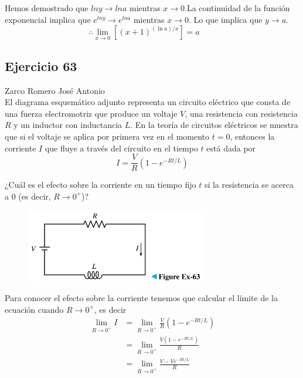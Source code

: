 \documentclass[12pt]{article}
\begin{document}
\begin{enumerate}[label=(\alph*)]
Hemos demostrado que $lny   \rightarrow lna $ mientras $x \rightarrow 0$.La continuidad de la función exponencial implica que $e^{lny}  \rightarrow e^{lna} $ mientras   $x \rightarrow 0$. Lo que implica que $y \rightarrow a $.
\[
\therefore
\lim_{x \to 0} [(x+1)^{(\ln a)/x}]=a \qquad
\]

\end{enumerate}

\subsection{Ejercicio 63} Zarco Romero José Antonio \\

El diagrama esquemático adjunto representa un circuito eléctrico que consta de una fuerza electromotriz que produce un voltaje $V$, una resistencia con resistencia $R$ y un inductor con inductancia $L$. En la teoría de circuitos eléctricos se muestra que si el voltaje se aplica por primera vez en el momento $t = 0$, entonces la corriente $I$ que fluye a través del circuito en el tiempo $t$ está dada por
\[
I=\frac{V}{R}\left(1-e^{-Rt/L}\right)
\]

¿Cuál es el efecto sobre la corriente en un tiempo fijo $t$ si la resistencia se acerca a $0$ (es decir, $R\rightarrow 0^+$)?

\begin{figure}[H]
\centering
\includegraphics[width=0.7\textwidth]{../img/img_Lista3/circuit63.png}
\end{figure}

Para conocer el efecto sobre la corriente tenemos que calcular el límite de la ecuación cuando $R\rightarrow 0^+$, es decir
\begin{align*}
  \lim_{R \to 0^+} I
  &= \lim_{R \to 0^+} \frac{V}{R}\left(1-e^{-Rt/L}\right) \\
  &= \lim_{R \to 0^+} \frac{V \left(1-e^{-Rt/L}\right)}{R} \\
  &= \lim_{R \to 0^+} \frac{V-Ve^{-Rt/L}}{R} \\
\end{align*}
\end{document}
